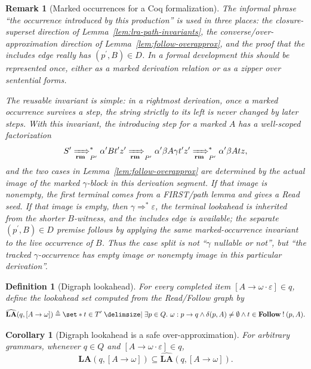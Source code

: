 \documentclass[11pt,a4paper]{article}
\theoremstyle{prettyplain}
\newtheorem{corollary}[theorem]{Corollary}
\theoremstyle{prettydef}
\newtheorem{definition}[theorem]{Definition}
\newtheorem*{remark}{Remark}
\def\mid{\;\delimsize\vert\;}#1%
\newcommand{\eps}{\varepsilon}
\newcommand{\RMP}{\xRightarrow[\mathbf{rm}]{}_{P^\prime}}
\newcommand{\Path}[3]{#1:#2\to#3}
\newcommand{\Item}[2]{[#1\to #2]}
\newcommand{\Look}{\mathbf{LA}}
\newcommand{\Follow}{\mathbf{Follow}}
\begin{document}
\begin{remark}[Marked occurrences for a Coq formalization]
The informal phrase ``the occurrence introduced by this production'' is used in
three places: the closure-superset direction of
Lemma~\ref{lem:lra-path-invariants}, the converse/over-approximation direction
of Lemma~\ref{lem:follow-overapprox}, and the proof that the includes edge really
has \((p^\prime,B)\in D\).  In a formal development this should be represented
once, either as a marked derivation relation or as a zipper over sentential
forms.

The reusable invariant is simple: in a rightmost derivation, once a marked
occurrence survives a step, the string strictly to its left is never changed by
later steps.  With this invariant, the introducing step for a marked \(A\) has a
well-scoped factorization
\[
S^\prime\RMP^*\alpha^\prime B t^\prime z^\prime
\RMP
\alpha^\prime\beta A\gamma t^\prime z^\prime
\RMP^*
\alpha^\prime\beta A t z,
\]
and the two cases in Lemma~\ref{lem:follow-overapprox} are determined by the
actual image of the marked \(\gamma\)-block in this derivation segment.  If that
image is nonempty, the first terminal comes from a FIRST/path lemma and gives a
Read seed.  If that image is empty, then \(\gamma\Rightarrow^*\eps\), the terminal
lookahead is inherited from the shorter \(B\)-witness, and the includes edge is
available; the separate \((p^\prime,B)\in D\) premise follows by applying the same
marked-occurrence invariant to the live occurrence of \(B\).  Thus the case split
is not ``\(\gamma\) nullable or not'', but ``the tracked \(\gamma\)-occurrence has
empty image or nonempty image in this particular derivation''.
\end{remark}


\begin{definition}[Digraph lookahead]\label{def:digraph-lookahead}
For every completed item \(\Item{A}{\omega\cdot\eps}\in q\), define the lookahead
set computed from the Read/Follow graph by
\begin{equation}\label{eq:la-follow-formula}
\widehat{\Look}(q,\Item{A}{\omega})
\triangleq
\set*{t\in T^\prime
\mid
\exists p\in Q.\
\Path{\omega}{p}{q}
\land
\delta(p,A)\ne\emptyset
\land
 t\in\Follow\mathbin{!}(p,A)}.
\end{equation}
\end{definition}

\begin{corollary}[Digraph lookahead is a safe over-approximation]
\label{cor:lookahead-overapprox}
For arbitrary grammars, whenever \(q\in Q\) and
\(\Item{A}{\omega\cdot\eps}\in q\),
\begin{equation}\label{eq:lookahead-overapprox}
\Look(q,\Item{A}{\omega})
\subseteq
\widehat{\Look}(q,\Item{A}{\omega}).
\end{equation}
\end{corollary}
\end{document}
